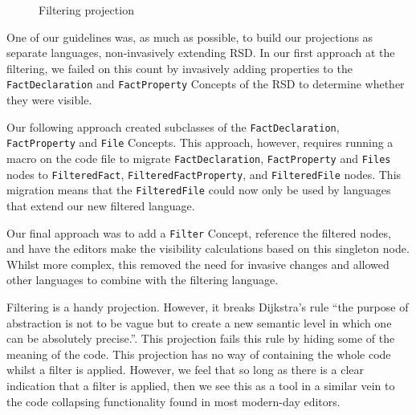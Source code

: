 \begin{figure}
    \centering
    \caption{Filtering projection}
    \label{fig:filteringProjection}
\end{figure}

One of our guidelines was, as much as possible, to build our projections as separate languages, non-invasively extending RSD.
In our first approach at the filtering, we failed on this count by invasively adding properties to the \texttt{FactDeclaration} and \texttt{FactProperty} Concepts of the RSD to determine whether they were visible.

Our following approach created subclasses of the \texttt{FactDeclaration}, \texttt{FactProperty} and \texttt{File} Concepts.
This approach, however, requires running a macro on the code file to migrate \texttt{FactDeclaration}, \texttt{FactProperty} and \texttt{Files} nodes to \texttt{FilteredFact}, \texttt{FilteredFactProperty}, and \texttt{FilteredFile} nodes.
This migration means that the \texttt{FilteredFile} could now only be used by languages that extend our new filtered language.

Our final approach was to add a \texttt{Filter} Concept, reference the filtered nodes, and have the editors make the visibility calculations based on this singleton node.
Whilst more complex, this removed the need for invasive changes and allowed other languages to combine with the filtering language.

Filtering is a handy projection.
However, it breaks Dijkstra's rule ``the purpose of abstraction is not to be vague but to create a new semantic level in which one can be absolutely precise.''\cite{dijkstra1972humble}.
This projection fails this rule by hiding some of the meaning of the code.
This projection has no way of containing the whole code whilst a filter is applied.
However, we feel that so long as there is a clear indication that a filter is applied, then we see this as a tool in a similar vein to the code collapsing functionality found in most modern-day editors.

